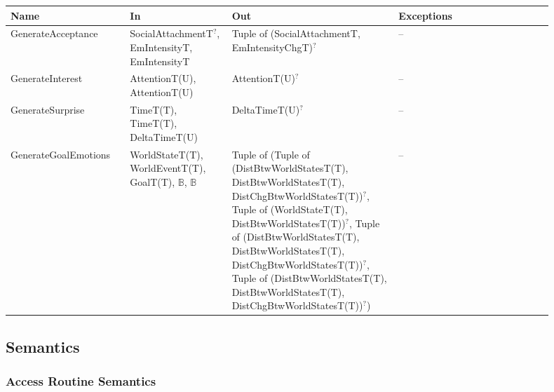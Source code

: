 \begin{center}
    \small
    \renewcommand{\arraystretch}{1.2}
    \begin{tabular}{m{0.19\linewidth} m{0.17\linewidth} m{0.28\linewidth}
            m{0.26\linewidth}}
        \toprule
        \textbf{Name} & \textbf{In} & \textbf{Out} & \textbf{Exceptions} \\
        \midrule

        \rowcolor[gray]{0.9}GenerateAcceptance & SocialAttachmentT$^?$,
        EmIntensityT, \newline EmIntensityT & Tuple of (SocialAttachmentT,
        EmIntensityChgT)$^?$ & -- \\

        GenerateInterest & AttentionT(U), \newline AttentionT(U) &
        AttentionT(U)$^?$ & -- \\

        \rowcolor[gray]{0.9}GenerateSurprise & TimeT(T), TimeT(T), \newline
        DeltaTimeT(U) & DeltaTimeT(U)$^?$ & -- \\

        GenerateGoalEmotions & WorldStateT(T), WorldEventT(T), GoalT(T),
        $\mathbb{B}$, $\mathbb{B}$ & Tuple of (Tuple of \newline
        (DistBtwWorldStatesT(T), DistBtwWorldStatesT(T),
        DistChgBtwWorldStatesT(T))$^?$, Tuple of (WorldStateT(T),
        DistBtwWorldStatesT(T))$^?$, Tuple of \newline (DistBtwWorldStatesT(T),
        DistBtwWorldStatesT(T), DistChgBtwWorldStatesT(T))$^?$, Tuple of
        \newline (DistBtwWorldStatesT(T), DistBtwWorldStatesT(T),
        DistChgBtwWorldStatesT(T))$^?$) & -- \\

        \bottomrule
    \end{tabular}
\end{center}

\subsection{Semantics}

\subsubsection{Access Routine Semantics}

